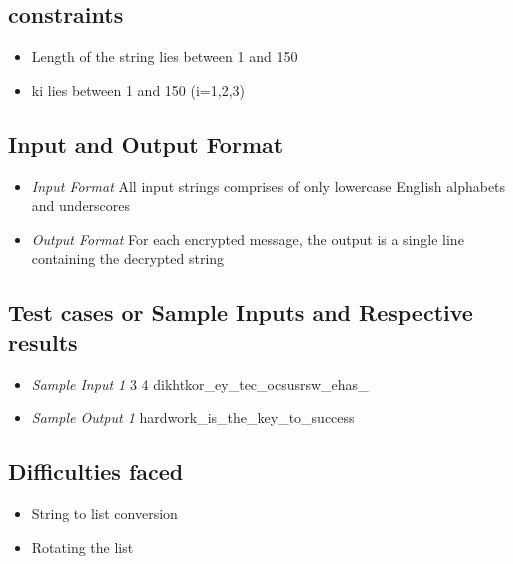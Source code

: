 \documentclass[10pt]{article}
\begin{document}
\subsection{constraints}
\begin{itemize}
	\item Length of the string lies between 1 and 150
	\item ki lies between 1 and 150 (i=1,2,3)
\end{itemize}

\subsection{Input and Output Format}
\begin{itemize}
	\item \textit{Input Format}
	\subitem All input strings comprises of only lowercase English alphabets and underscores
	\item \textit{Output Format}
	\subitem For each encrypted message, the output is a single line containing the decrypted string 
\end{itemize}

\subsection{Test cases or Sample Inputs and Respective results}
\begin{itemize}
	\item \textit{Sample Input 1}
	 3 4
	\subitem dikhtkor\_ey\_tec\_ocsusrsw\_ehas\_
	
	\item \textit{Sample Output 1}
	\subitem hardwork\_is\_the\_key\_to\_success
\end{itemize}

\subsection{Difficulties faced}
\begin{itemize}
	\item String to list conversion
	\item Rotating the list
\end{itemize}
\end{document}
